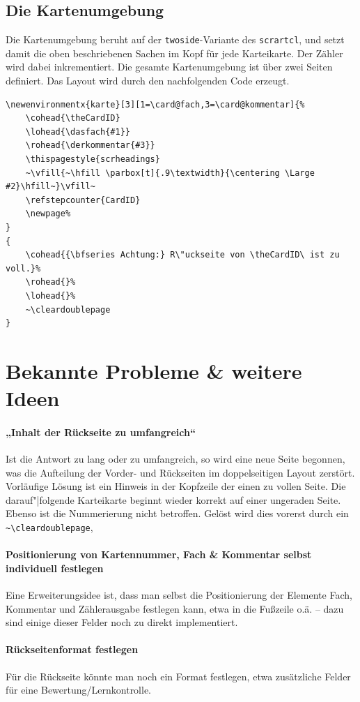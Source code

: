 \documentclass[a4paper,DIV=calc]{scrartcl}
\begin{document}
\subsection{Die Kartenumgebung}
Die Kartenumgebung beruht auf der \lstinline!twoside!-Variante des \lstinline!scrartcl!, und setzt damit die oben beschriebenen Sachen im Kopf für jede Karteikarte. Der Zähler wird dabei inkrementiert. Die gesamte Kartenumgebung ist über zwei Seiten definiert. Das Layout wird durch den nachfolgenden Code erzeugt.
\begin{lstlisting}[title=Die Kartenumgebung,float=h]
\newenvironmentx{karte}[3][1=\card@fach,3=\card@kommentar]{%
	\cohead{\theCardID}
	\lohead{\dasfach{#1}}
	\rohead{\derkommentar{#3}}
	\thispagestyle{scrheadings}
	~\vfill{~\hfill \parbox[t]{.9\textwidth}{\centering \Large #2}\hfill~}\vfill~
	\refstepcounter{CardID}
	\newpage%
}
{
	\cohead{{\bfseries Achtung:} R\"uckseite von \theCardID\ ist zu voll.}%
	\rohead{}%
	\lohead{}%
	~\cleardoublepage
}
\end{lstlisting}
%
%
%
\section{Bekannte Probleme \& weitere Ideen}
\paragraph{„Inhalt der Rückseite zu umfangreich“} %
Ist die Antwort zu lang oder zu umfangreich, so wird eine neue Seite begonnen, was die Aufteilung der Vorder- und Rückseiten im doppelseitigen Layout zerstört. Vorläufige Lösung ist ein Hinweis in der Kopfzeile der einen zu vollen Seite. Die darauf"|folgende Karteikarte beginnt wieder korrekt auf einer ungeraden Seite. Ebenso ist die Nummerierung nicht betroffen. Gelöst wird dies vorerst durch ein \lstinline!~\cleardoublepage!,

\paragraph{Positionierung von Kartennummer, Fach \& Kommentar selbst individuell festlegen}
Eine Erweiterungsidee ist, dass man selbst die Positionierung der Elemente Fach, Kommentar und Zählerausgabe festlegen kann, etwa in die Fußzeile o.ä. -- dazu sind einige dieser Felder noch zu direkt implementiert.

\paragraph{Rückseitenformat festlegen}
Für die Rückseite könnte man noch ein Format festlegen, etwa zusätzliche Felder für eine Bewertung/Lernkontrolle.
\end{document}
